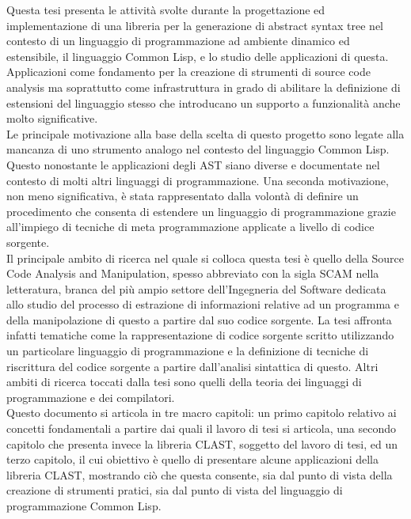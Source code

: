 \documentclass{book}
\begin{document}
Questa tesi presenta le attività svolte durante la progettazione ed
implementazione di una libreria per la generazione di abstract syntax tree nel
contesto di un linguaggio di programmazione ad ambiente dinamico ed estensibile,
il linguaggio Common Lisp, e lo studio delle applicazioni di questa.
Applicazioni come fondamento per la creazione di strumenti di source code
analysis ma soprattutto come infrastruttura in grado di abilitare la definizione
di estensioni del linguaggio stesso che introducano un supporto a funzionalità
anche molto significative.\\

Le principale motivazione alla base della scelta di questo progetto sono legate
alla mancanza di uno strumento analogo nel contesto del linguaggio Common Lisp.
Questo nonostante le applicazioni degli AST siano diverse e documentate nel
contesto di molti altri linguaggi di programmazione. Una seconda motivazione,
non meno significativa, è stata rappresentato dalla volontà di definire un
procedimento che consenta di estendere un linguaggio di programmazione grazie
all’impiego di tecniche di meta programmazione applicate a livello di codice
sorgente.\\

Il principale ambito di ricerca nel quale si colloca questa tesi è quello della
Source Code Analysis and Manipulation, spesso abbreviato con la sigla SCAM nella
letteratura, branca del più ampio settore dell’Ingegneria del Software dedicata
allo studio del processo di estrazione di informazioni relative ad un programma
e della manipolazione di questo a partire dal suo codice sorgente. La tesi
affronta infatti tematiche come la rappresentazione di codice sorgente scritto
utilizzando un particolare linguaggio di programmazione e la definizione di
tecniche di riscrittura del codice sorgente a partire dall’analisi sintattica di
questo. Altri ambiti di ricerca toccati dalla tesi sono quelli della teoria dei
linguaggi di programmazione e dei compilatori.\\

Questo documento si articola in tre macro capitoli: un primo capitolo relativo
ai concetti fondamentali a partire dai quali il lavoro di tesi si articola, una
secondo capitolo che presenta invece la libreria CLAST, soggetto del lavoro di
tesi, ed un terzo capitolo, il cui obiettivo è quello di presentare alcune
applicazioni della libreria CLAST, mostrando ciò che questa consente, sia dal
punto di vista della creazione di strumenti pratici, sia dal punto di vista del
linguaggio di programmazione Common Lisp.\\
\end{document}
